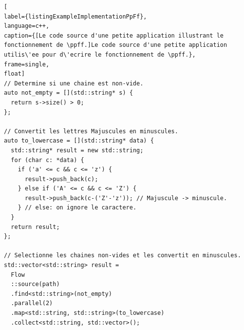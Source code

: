 \begin{lstlisting}[
label={listingExampleImplementationPpFf},
language=c++,
caption={[Le code source d'une petite application illustrant le fonctionnement de \ppff.]Le code source d'une petite application utilis\'ee pour d\'ecrire le fonctionnement de \ppff.},
frame=single,
float]
// Determine si une chaine est non-vide.
auto not_empty = [](std::string* s) {
  return s->size() > 0;
};
	
// Convertit les lettres Majuscules en minuscules.
auto to_lowercase = [](std::string* data) {
  std::string* result = new std::string;
  for (char c: *data) {
    if ('a' <= c && c <= 'z') {
   	  result->push_back(c);
   	} else if ('A' <= c && c <= 'Z') {
	  result->push_back(c-('Z'-'z')); // Majuscule -> minuscule.
   	} // else: on ignore le caractere.
  }
  return result;	
};

// Selectionne les chaines non-vides et les convertit en minuscules.
std::vector<std::string> result = 
  Flow
  ::source(path)
  .find<std::string>(not_empty)
  .parallel(2)
  .map<std::string, std::string>(to_lowercase)
  .collect<std::string, std::vector>();
\end{lstlisting}





